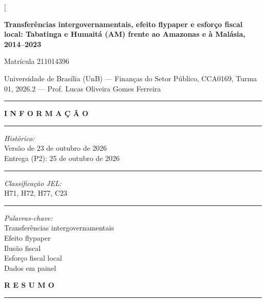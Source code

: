 \documentclass[10pt,twocolumn]{article}
\begin{document}
\twocolumn[{
\begin{@twocolumnfalse}
\vspace{2pt}
{\LARGE\bfseries Transferências intergovernamentais, efeito flypaper e esforço fiscal local: Tabatinga e Humaitá (AM) frente ao Amazonas e à Malásia, 2014--2023\par}
\vspace{8pt}
{\large Matrícula 211014396}\par
\vspace{3pt}
{\footnotesize Universidade de Brasília (UnB) --- Finanças do Setor Público, CCA0169, Turma 01, 2026.2 --- Prof. Lucas Oliveira Gomes Ferreira}\par
\vspace{6pt}\hrule\vspace{6pt}
\noindent\begin{minipage}[t]{0.27\textwidth}\footnotesize
\textbf{I N F O R M A Ç Ã O}\par\vspace{3pt}\hrule\vspace{3pt}
\textit{Histórico:}\\ Versão de 23 de outubro de 2026\\ Entrega (P2): 25 de outubro de 2026\par\vspace{3pt}\hrule\vspace{3pt}
\textit{Classificação JEL:}\\ H71, H72, H77, C23\par\vspace{3pt}\hrule\vspace{3pt}
\textit{Palavras-chave:}\\ Transferências intergovernamentais\\ Efeito flypaper\\ Ilusão fiscal\\ Esforço fiscal local\\ Dados em painel
\end{minipage}\hfill
\begin{minipage}[t]{0.69\textwidth}\small
\textbf{R E S U M O}\par\vspace{3pt}\hrule\vspace{3pt}

\end{minipage}
\end{@twocolumnfalse}}
\end{document}
